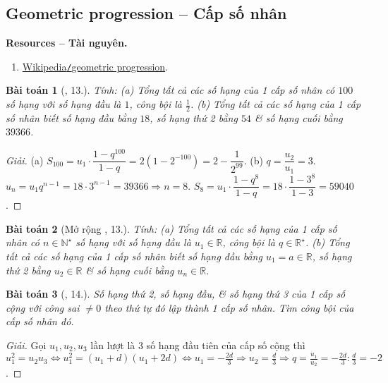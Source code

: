 \documentclass[oneside]{book}
\newtheorem{baitoan}{Bài toán}
\begin{document}

\subsection{Geometric progression -- Cấp số nhân}
\textbf{\textsf{Resources -- Tài nguyên.}}
\begin{enumerate}
	\item \href{https://en.wikipedia.org/wiki/Geometric_progression}{Wikipedia{\tt/}geometric progression}.
\end{enumerate}

\begin{baitoan}[\cite{TLCT_dai_so_giai_tich_11}, 13.]
	Tính: (a) Tổng tất cả các số hạng của 1 cấp số nhân có $100$ số hạng với số hạng đầu là $1$, công bội là $\frac{1}{2}$. (b) Tổng tất cả các số hạng của 1 cấp số nhân biết số hạng đầu bằng $18$, số hạng thứ 2 bằng $54$ \& số hạng cuối bằng $39366$.
\end{baitoan}

\begin{proof}[Giải]
	(a) $S_{100} = u_1\cdot\dfrac{1 - q^{100}}{1 - q} = 2(1 - 2^{-100}) = 2 - \dfrac{1}{2^{99}}$. (b) $q = \dfrac{u_2}{u_1} = 3$. $u_n = u_1q^{n-1} = 18\cdot3^{n-1} = 39366\Rightarrow n = 8$. $S_8 = u_1\cdot\dfrac{1 - q^8}{1 - q} = 18\cdot\dfrac{1 - 3^8}{1 - 3} = 59040$.
\end{proof}

\begin{baitoan}[Mở rộng \cite{TLCT_dai_so_giai_tich_11}, 13.]
	Tính: (a) Tổng tất cả các số hạng của 1 cấp số nhân có $n\in\mathbb{N}^\star$ số hạng với số hạng đầu là $u_1\in\mathbb{R}$, công bội là $q\in\mathbb{R}^\star$. (b) Tổng tất cả các số hạng của 1 cấp số nhân biết số hạng đầu bằng $u_1 = a\in\mathbb{R}$, số hạng thứ 2 bằng $u_2\in\mathbb{R}$ \& số hạng cuối bằng $u_n\in\mathbb{R}$.
\end{baitoan}

\begin{baitoan}[\cite{TLCT_dai_so_giai_tich_11}, 14.]
	Số hạng thứ 2, số hạng đầu, \& số hạng thứ 3 của 1 cấp số cộng với công sai $\ne0$ theo thứ tự đó lập thành 1 cấp số nhân. Tìm công bội của cấp số nhân đó.
\end{baitoan}

\begin{proof}[Giải]
	Gọi $u_1,u_2,u_3$ lần lượt là 3 số hạng đầu tiên của cấp số cộng thì $u_1^2 = u_2u_3\Leftrightarrow u_1^2 = (u_1 + d)(u_1 + 2d)\Leftrightarrow u_1 = -\frac{2d}{3}\Rightarrow u_2 = \frac{d}{3}\Rightarrow q = \frac{u_1}{u_2} = -\frac{2d}{3}:\frac{d}{3} = -2$.
\end{proof}
\end{document}
